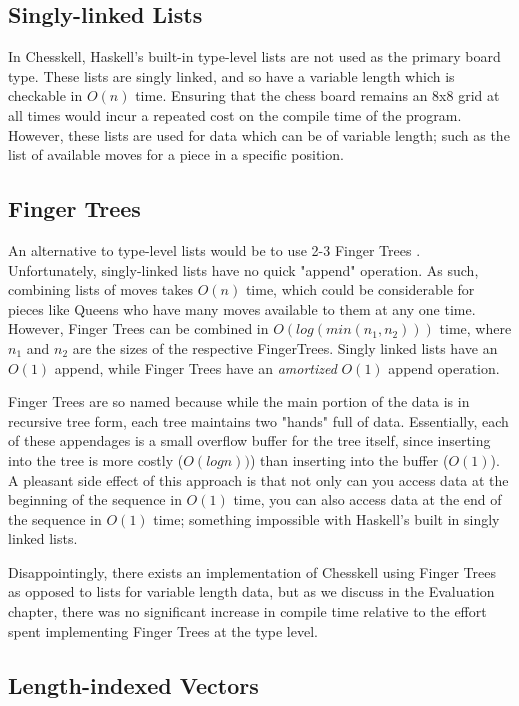 \documentclass[12pt, a4paper, bibliography=totocnumbered]{scrreprt}
\begin{document}
\subsection{Singly-linked Lists}

In Chesskell, Haskell's built-in type-level lists are not used as the primary board type. These lists are singly linked, and so have a variable length which is checkable in $O(n)$ time. Ensuring that the chess board remains an 8x8 grid at all times would incur a repeated cost on the compile time of the program. However, these lists are used for data which can be of variable length; such as the list of available moves for a piece in a specific position.

\subsection{Finger Trees}

An alternative to type-level lists would be to use 2-3 Finger Trees \cite{fingertrees}. Unfortunately, singly-linked lists have no quick "append" operation. As such, combining lists of moves takes $O(n)$ time, which could be considerable for pieces like Queens who have many moves available to them at any one time. However, Finger Trees can be combined in $O(log(min(n_{1}, n_{2})))$ time, where $n_{1}$ and $n_{2}$ are the sizes of the respective FingerTrees. Singly linked lists have an $O(1)$ append, while Finger Trees have an \emph{amortized} $O(1)$ append operation.

Finger Trees are so named because while the main portion of the data is in recursive tree form, each tree maintains two "hands" full of data. Essentially, each of these appendages is a small overflow buffer for the tree itself, since inserting into the tree is more costly ($O(log n))$) than inserting into the buffer ($O(1)$). A pleasant side effect of this approach is that not only can you access data at the beginning of the sequence in $O(1)$ time, you can also access data at the end of the sequence in $O(1)$ time; something impossible with Haskell's built in singly linked lists.

Disappointingly, there exists an implementation of Chesskell using Finger Trees as opposed to lists for variable length data, but as we discuss in the Evaluation chapter, there was no significant increase in compile time relative to the effort spent implementing Finger Trees at the type level.

\subsection{Length-indexed Vectors}
\end{document}
